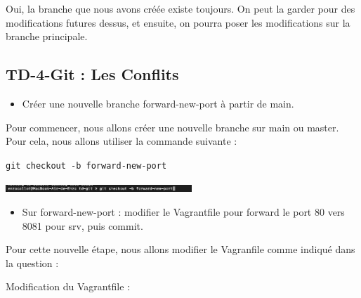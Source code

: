 \documentclass[12pt]{article}
\begin{document}
\vspace{0.3cm}

Oui, la branche que nous avons créée existe toujours. On peut la garder pour des modifications futures dessus, et ensuite, on pourra poser les modifications sur la branche principale.

\newpage

\subsection{TD-4-Git : Les Conflits}

\vspace{0.3cm}

\begin{itemize}
  \item Créer une nouvelle branche forward-new-port à partir de main.
\end{itemize}

\vspace{0.3cm}

Pour commencer, nous allons créer une nouvelle branche sur main ou master. Pour cela, nous allons utiliser la commande suivante :

\texttt{git checkout -b forward-new-port}

\vspace{0.3cm}

\begin{center}
  \includegraphics[width=7cm]{Images-TD-Git/Image-TD-Git-4/git-checkout.png}
\end{center}

\vspace{0.3cm}

\begin{itemize}
  \item Sur forward-new-port : modifier le Vagrantfile pour forward le port 80 vers 8081 pour srv, puis commit.
\end{itemize}

\vspace{0.3cm}

Pour cette nouvelle étape, nous allons modifier le Vagranfile comme indiqué dans la question :

\vspace{0.3cm}

Modification du Vagrantfile : 

\vspace{0.3cm}
\end{document}
